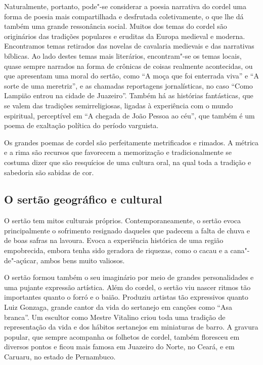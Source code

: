 Naturalmente, portanto, pode"-se considerar a poesia narrativa do cordel
uma forma de poesia mais compartilhada e desfrutada coletivamente, o
que lhe dá também uma grande ressonância social. Muitos dos temas do
cordel são originários das tradições populares e eruditas da Europa
medieval e moderna. Encontramos temas retirados das novelas de
cavalaria medievais e das narrativas bíblicas. Ao lado destes temas
mais literários, encontram"-se os temas locais, quase sempre narrados na
forma de crônicas de coisas realmente acontecidas, ou que apresentam
uma moral do sertão, como ``A moça que foi enterrada
viva'' e ``A sorte de uma
meretriz'', e as chamadas reportagens jornalísticas,
no caso ``Como Lampião entrou na cidade de
Juazeiro''. Também há as histórias fantásticas, que
se valem das tradições semirreligiosas, ligadas à experiência com o
mundo espiritual, perceptível em ``A chegada de João
Pessoa ao céu'', que também é um poema de exaltação
política do período varguista. 

Os grandes poemas de cordel são perfeitamente metrificados e rimados. A
métrica e a rima são recursos que favorecem a memorização e
tradicionalmente se costuma dizer que são resquícios de uma cultura
oral, na qual toda a tradição e sabedoria são sabidas de cor.

\subsection{O sertão geográfico e cultural}

O sertão tem mitos culturais próprios. Contemporaneamente, o sertão
evoca principalmente o sofrimento resignado daqueles que padecem a
falta de chuva e de boas safras na lavoura. Evoca a experiência
histórica de uma região empobrecida, embora tenha sido geradora de
riquezas, como o cacau e a cana"-de"-açúcar, ambos bens muito valiosos. 

O sertão formou também o seu imaginário por meio de grandes
personalidades e uma pujante expressão artística. Além do cordel, o
sertão viu nascer ritmos tão importantes quanto o forró e o baião.
Produziu artistas tão expressivos quanto Luiz Gonzaga, grande cantor da
vida do sertanejo em canções como ``Asa
branca''. Um escultor como Mestre Vitalino criou toda
uma tradição de representação da vida e dos hábitos sertanejos em
miniaturas de barro. A gravura popular, que sempre acompanha os
folhetos de cordel, também floresceu em diversos pontos e ficou mais
famosa em Juazeiro do Norte, no Ceará, e em Caruaru, no estado de
Pernambuco. 

